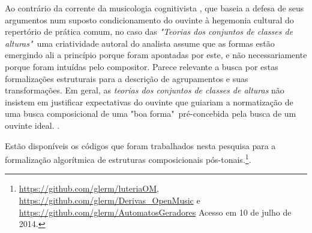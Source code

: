 \documentclass[
	12pt,				%
	openright,			%
	twoside,			%
	a4paper,			%
	english,			%
	french,				%
	spanish,			%
	brazil				%
	]{abntex2}
\begin{document}
Ao contrário da corrente da musicologia cognitivista \cite{lerdahl1983generative,krumhansl1990cognitive,temperley2001cognition}, que baseia a defesa de seus argumentos num suposto condicionamento do ouvinte à hegemonia cultural do repertório de prática comum, no caso das \textit{"Teorias dos conjuntos de classes de alturas"}\ uma criatividade autoral do analista assume que as formas estão emergindo ali a princípio porque foram apontadas por este, e não necessariamente porque foram intuídas pelo compositor. Parece relevante a busca por estas formalizações estruturais para a descrição de agrupamentos e suas transformações. Em geral, as \textit{teorias dos conjuntos de classes de alturas} não insistem em justificar expectativas do ouvinte que guiariam a normatização de uma busca composicional de uma "boa forma"\  pré-concebida pela busca de um ouvinte ideal. \cite{babbitt1958cares}.

Estão disponíveis os códigos que foram trabalhados nesta pesquisa para a formalização algorítmica de estruturas composicionais pós-tonais.\footnote{\url{https://github.com/glerm/luteriaOM}, \url{https://github.com/glerm/Derivas_OpenMusic} e \url{https://github.com/glerm/AutomatosGeradores} Acesso em 10 de julho de 2014. }. 



\postextual

%

%
%







\end{document}
